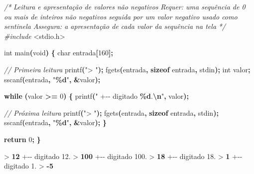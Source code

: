 \documentclass[
  11pt,
  a4paper,
]{scrbook}
\newenvironment{Shaded}{\begin{snugshade}}{\end{snugshade}}
\newcommand{\CommentTok}[1]{\textcolor[rgb]{0.56,0.35,0.01}{\textit{#1}}}
\newcommand{\ControlFlowTok}[1]{\textcolor[rgb]{0.13,0.29,0.53}{\textbf{#1}}}
\newcommand{\DataTypeTok}[1]{\textcolor[rgb]{0.13,0.29,0.53}{#1}}
\newcommand{\DecValTok}[1]{\textcolor[rgb]{0.00,0.00,0.81}{#1}}
\newcommand{\ImportTok}[1]{#1}
\newcommand{\KeywordTok}[1]{\textcolor[rgb]{0.13,0.29,0.53}{\textbf{#1}}}
\newcommand{\NormalTok}[1]{#1}
\newcommand{\OperatorTok}[1]{\textcolor[rgb]{0.81,0.36,0.00}{\textbf{#1}}}
\newcommand{\PreprocessorTok}[1]{\textcolor[rgb]{0.56,0.35,0.01}{\textit{#1}}}
\newcommand{\SpecialCharTok}[1]{\textcolor[rgb]{0.81,0.36,0.00}{\textbf{#1}}}
\newcommand{\StringTok}[1]{\textcolor[rgb]{0.31,0.60,0.02}{#1}}
\begin{document}
\begin{Shaded}
\begin{Highlighting}[]
\CommentTok{/*}
\CommentTok{Leitura e apresentação de valores não negativos}
\CommentTok{Requer: uma sequência de 0 ou mais de inteiros não negativos seguida}
\CommentTok{    por um valor negativo usado como sentinela}
\CommentTok{Assegura: a apresentação de cada valor da sequência na tela}
\CommentTok{*/}
\PreprocessorTok{\#include }\ImportTok{\textless{}stdio.h\textgreater{}}

\DataTypeTok{int}\NormalTok{ main}\OperatorTok{(}\DataTypeTok{void}\OperatorTok{)} \OperatorTok{\{}
    \DataTypeTok{char}\NormalTok{ entrada}\OperatorTok{[}\DecValTok{160}\OperatorTok{];}

    \CommentTok{// Primeira leitura}
\NormalTok{    printf}\OperatorTok{(}\StringTok{"\textgreater{} "}\OperatorTok{);}
\NormalTok{    fgets}\OperatorTok{(}\NormalTok{entrada}\OperatorTok{,} \KeywordTok{sizeof}\NormalTok{ entrada}\OperatorTok{,}\NormalTok{ stdin}\OperatorTok{);}
    \DataTypeTok{int}\NormalTok{ valor}\OperatorTok{;}
\NormalTok{    sscanf}\OperatorTok{(}\NormalTok{entrada}\OperatorTok{,} \StringTok{"}\SpecialCharTok{\%d}\StringTok{"}\OperatorTok{,} \OperatorTok{\&}\NormalTok{valor}\OperatorTok{);}

    \ControlFlowTok{while} \OperatorTok{(}\NormalTok{valor }\OperatorTok{\textgreater{}=} \DecValTok{0}\OperatorTok{)} \OperatorTok{\{}
\NormalTok{        printf}\OperatorTok{(}\StringTok{"  +{-}{-} digitado }\SpecialCharTok{\%d}\StringTok{.}\SpecialCharTok{\textbackslash{}n}\StringTok{"}\OperatorTok{,}\NormalTok{ valor}\OperatorTok{);}

        \CommentTok{// Próxima leitura}
\NormalTok{        printf}\OperatorTok{(}\StringTok{"\textgreater{} "}\OperatorTok{);}
\NormalTok{        fgets}\OperatorTok{(}\NormalTok{entrada}\OperatorTok{,} \KeywordTok{sizeof}\NormalTok{ entrada}\OperatorTok{,}\NormalTok{ stdin}\OperatorTok{);}
\NormalTok{        sscanf}\OperatorTok{(}\NormalTok{entrada}\OperatorTok{,} \StringTok{"}\SpecialCharTok{\%d}\StringTok{"}\OperatorTok{,} \OperatorTok{\&}\NormalTok{valor}\OperatorTok{);}
    \OperatorTok{\}}

    \ControlFlowTok{return} \DecValTok{0}\OperatorTok{;}
\OperatorTok{\}}
\end{Highlighting}
\end{Shaded}

\begin{Shaded}
\begin{Highlighting}[]
\NormalTok{\textgreater{} }\KeywordTok{ 12 }
\NormalTok{  +{-}{-} digitado 12.}
\NormalTok{\textgreater{} }\KeywordTok{ 100 }
\NormalTok{  +{-}{-} digitado 100.}
\NormalTok{\textgreater{} }\KeywordTok{ 18 }
\NormalTok{  +{-}{-} digitado 18.}
\NormalTok{\textgreater{} }\KeywordTok{ 1 }
\NormalTok{  +{-}{-} digitado 1.}
\NormalTok{\textgreater{} }\KeywordTok{ {-}5 }
\end{Highlighting}
\end{Shaded}
\end{document}
